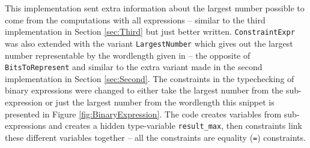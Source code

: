 \documentclass[msc,lith,english]{liuthesis}
\begin{document}
This implementation sent extra information about the largest number possible to come from the computations with all expressions -- similar to the third implementation in Section \ref{sec:Third} but just better written. \verb+ConstraintExpr+ was also extended with the variant \verb+LargestNumber+ which gives out the largest number representable by the wordlength given in -- the opposite of \verb+BitsToRepresent+ and similar to the extra variant made in the second implementation in Section \ref{sec:Second}. The constraints in the typechecking of binary expressions were changed to either take the largest number from the sub-expression or just the largest number from the wordlength this snippet is presented in Figure \ref{fig:BinaryExpression}. The code creates variables from sub-expressions and creates a hidden type-variable \verb+result_max+, then constraints link these different variables together -- all the constraints are equality (\verb+=+) constraints.
\end{document}
